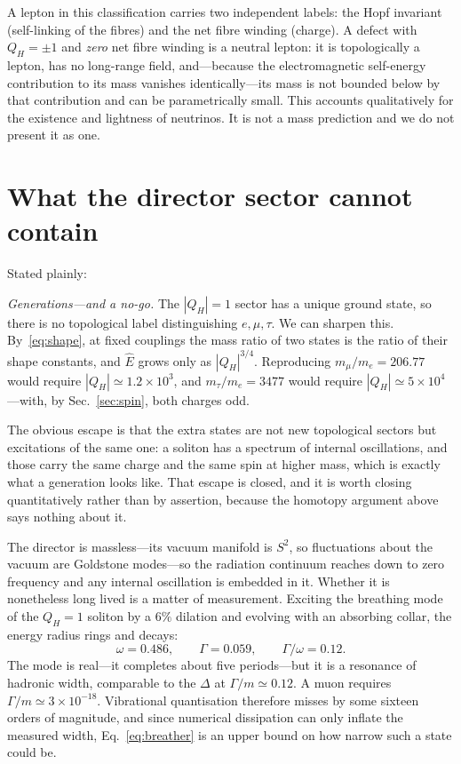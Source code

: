 \documentclass[aps,prd,preprint,nofootinbib,longbibliography]{revtex4-2}
\newcommand{\Qh}{Q_H}
\newcommand{\Ehat}{\hat{E}}
\begin{document}
A lepton in this classification carries two independent labels: the Hopf
invariant (self-linking of the fibres) and the net fibre winding (charge). A
defect with $\Qh=\pm1$ and \emph{zero} net fibre winding is a neutral lepton: it
is topologically a lepton, has no long-range field, and---because the
electromagnetic self-energy contribution to its mass vanishes identically---its
mass is not bounded below by that contribution and can be parametrically small.
This accounts qualitatively for the existence and lightness of neutrinos. It is
not a mass prediction and we do not present it as one.

\section{What the director sector cannot contain}
\label{sec:nogo}

Stated plainly:

\emph{Generations---and a no-go.} The $|\Qh|=1$ sector has a unique ground state,
so there is no topological label distinguishing $e,\mu,\tau$. We can sharpen
this. By~\eqref{eq:shape}, at fixed couplings the mass ratio of two states is the
ratio of their shape constants, and $\Ehat$ grows only as $|\Qh|^{3/4}$.
Reproducing $m_\mu/m_e=206.77$ would require $|\Qh|\simeq1.2\times10^3$, and
$m_\tau/m_e=3477$ would require $|\Qh|\simeq5\times10^4$---with, by
Sec.~\ref{sec:spin}, both charges odd.

The obvious escape is that the extra states are not new topological sectors but
excitations of the same one: a soliton has a spectrum of internal oscillations,
and those carry the same charge and the same spin at higher mass, which is
exactly what a generation looks like. That escape is closed, and it is worth
closing quantitatively rather than by assertion, because the homotopy argument
above says nothing about it.

The director is massless---its vacuum manifold is $S^2$, so fluctuations about
the vacuum are Goldstone modes---so the radiation continuum reaches down to zero
frequency and any internal oscillation is embedded in it. Whether it is
nonetheless long lived is a matter of measurement. Exciting the breathing mode of
the $\Qh=1$ soliton by a $6\%$ dilation and evolving with an absorbing collar,
the energy radius rings and decays:
\begin{equation}
\omega = 0.486, \qquad \Gamma = 0.059, \qquad \Gamma/\omega = 0.12 .
\label{eq:breather}
\end{equation}
The mode is real---it completes about five periods---but it is a resonance of
hadronic width, comparable to the $\Delta$ at $\Gamma/m\simeq0.12$. A muon
requires $\Gamma/m\simeq3\times10^{-18}$. Vibrational quantisation therefore
misses by some sixteen orders of magnitude, and since numerical dissipation can
only inflate the measured width, Eq.~\eqref{eq:breather} is an upper bound on how
narrow such a state could be.
\end{document}
